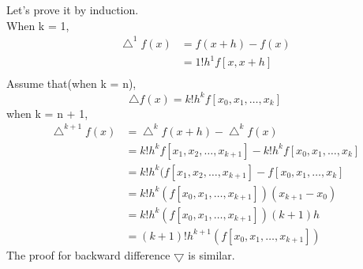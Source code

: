 \documentclass[UTF8]{ctexart}
\begin{document}
\section{}
Let's prove it by induction.\\
When k = 1,
\begin{equation}
    \begin{aligned}
         \bigtriangleup ^1 f(x) &= f(x+h) - f(x)\\
         &= 1!h^1f[x,x+h]\\
         \nonumber
    \end{aligned}
\end{equation}
Assume that(when k = n),
$$\bigtriangleup f(x) = k!h^kf[x_0,x_1,\dots ,x_k]$$
when k = n + 1,
\begin{equation}
    \begin{aligned}
        \bigtriangleup ^{k+1} f(x) &= \bigtriangleup ^{k} f(x+h) - \bigtriangleup ^{k} f(x)\\
        &= k!h^kf[x_1,x_2,\dots ,x_{k+1}] - k!h^kf[x_0,x_1,\dots ,x_k]\\
        &= k!h^k(f[x_1,x_2,\dots ,x_{k+1}] - f[x_0,x_1,\dots ,x_{k}]\\
        &= k!h^k(f[x_0,x_1,\dots ,x_{k+1}])(x_{k+1} - x_0)\\
        &= k!h^k(f[x_0,x_1,\dots ,x_{k+1}])(k+1)h\\
        &= (k+1)!h^{k+1}(f[x_0,x_1,\dots ,x_{k+1}])
        \nonumber
    \end{aligned}
\end{equation}
The proof for backward difference $\bigtriangledown$ is similar.
\end{document}
